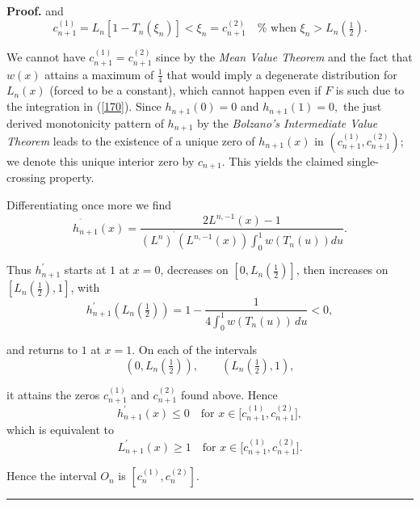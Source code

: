 \documentclass[onecolumn]{article}
\providecommand{\dint}{\displaystyle\int}
\newenvironment{proof}[1][Proof]{\noindent\textbf{#1.} }{\ \rule{0.5em}{0.5em}}
\renewcommand{\dint}{\displaystyle\int}
\begin{document}
\begin{proof}
and%
\begin{equation}
c_{n+1}^{(1)}=L_{n}[1-T_{n}(\xi _{n})]<\xi _{n}=c_{n+1}^{(2)}\quad \text{%
when }\xi _{n}>L_{n}\!(\tfrac{1}{2}).  \label{171f}
\end{equation}

We cannot have $c_{n+1}^{(1)}=c_{n+1}^{(2)}$ since by the \textit{Mean Value
Theorem} and the fact that $w(x)$ attains a maximum of $\frac{1}{4}$ that
would imply a degenerate distribution for $L_{n}(x)$ (forced to be a
constant), which cannot happen even if $F$ is such due to the integration in
(\ref{170}). Since $h_{n+1}(0)=0$ and $h_{n+1}(1)=0,$ the just derived
monotonicity pattern of $h_{n+1}$ by the \textit{Bolzano's Intermediate
Value Theorem} leads to the existence of a unique zero of $h_{n+1}(x)$ in $%
(c_{n+1}^{(1)},c_{n+1}^{(2)})$; we denote this unique interior zero by $%
c_{n+1}$. This yields the claimed single-crossing property.

Differentiating once more we find%
\begin{equation}
h_{n+1}^{^{^{\prime \prime }}}(x)=\frac{2L^{n,-1}(x)-1}{(L^{n})^{^{\prime
}}(L^{n,-1}(x))\dint\nolimits_{0}^{1}w(T_{n}(u))du}.  \label{172}
\end{equation}

Thus $h_{n+1}^{\prime }$ starts at $1$ at $x=0$, decreases on $[0,L_{n}(%
\tfrac{1}{2})]$, then increases on $[L_{n}(\tfrac{1}{2}),1]$, with 
\begin{equation}
h_{n+1}^{\prime }\!(L_{n}(\tfrac{1}{2}))=1-\frac{1}{4\int_{0}^{1}w(T_{n}(u))%
\,du}<0,  \label{172aa}
\end{equation}

and returns to $1$ at $x=1$. On each of the intervals%
\begin{equation}
(0,L_{n}(\tfrac{1}{2})),\qquad (L_{n}(\tfrac{1}{2}),1),  \label{172aaa}
\end{equation}

it attains the zeros $c_{n+1}^{(1)}$ and $c_{n+1}^{(2)}$ found above. Hence 
\begin{equation}
h_{n+1}^{\prime }(x)\leq 0\quad \text{for }x\in \lbrack
c_{n+1}^{(1)},c_{n+1}^{(2)}],  \label{172bbb}
\end{equation}%
which is equivalent to 
\begin{equation}
L_{n+1}^{\prime }(x)\geq 1\quad \text{for }x\in \lbrack
c_{n+1}^{(1)},c_{n+1}^{(2)}].  \label{172b1}
\end{equation}

Hence the interval $O_{n}$ is $[c_{n}^{(1)},c_{n}^{(2)}]$.
\end{proof}
\end{document}
